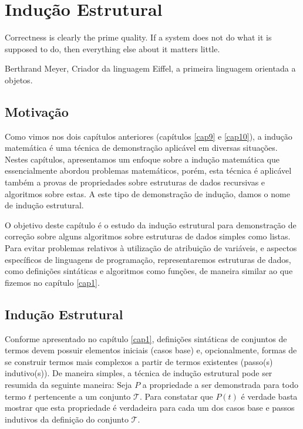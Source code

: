 \chapter{Indução Estrutural}\label{cap11}


\epigraph{Correctness is clearly the prime quality. If a system does
  not do what it is supposed to do, then everything else about it
  matters little.}{Berthrand Meyer, Criador da linguagem Eiffel, a
  primeira linguagem orientada a objetos.}

\section{Motivação}

Como vimos nos dois capítulos anteriores (capítulos \ref{cap9} e
\ref{cap10}), a indução matemática é uma técnica de demonstração
aplicável em diversas situações. Nestes capítulos, apresentamos um
enfoque sobre a indução matemática que essencialmente abordou
problemas matemáticos, porém, esta técnica é aplicável
também a provas de propriedades sobre estruturas de dados recursivas e
algoritmos sobre estas. A este tipo de demonstração de indução, damos
o nome de indução estrutural.

O objetivo deste capítulo é o estudo da indução estrutural para
demonstração de correção sobre alguns algoritmos sobre
estruturas de dados simples como listas. Para
evitar problemas relativos à utilização de atribuição de variáveis, e
aspectos específicos de linguagens de programação,
representaremos estruturas de dados, como definições sintáticas e
algoritmos como funções, de maneira similar ao que fizemos no capítulo
\ref{cap1}.

\section{Indução Estrutural}

Conforme apresentado no capítulo \ref{cap1}, definições sintáticas de
conjuntos de termos devem possuir elementos iniciais (casos base) e,
opcionalmente, formas de se construir termos mais complexos a
partir de termos existentes (passo(s) indutivo(s)).
De maneira simples, a técnica de indução estrutural pode ser resumida
da seguinte maneira: Seja $P$ a propriedade a ser demonstrada para
todo termo $t$ pertencente a um conjunto $\mathcal{T}$. Para constatar
que $P(t)$ é verdade basta mostrar que esta propriedade é verdadeira
para cada um dos casos base e passos indutivos da definição do
conjunto $\mathcal{T}$.

